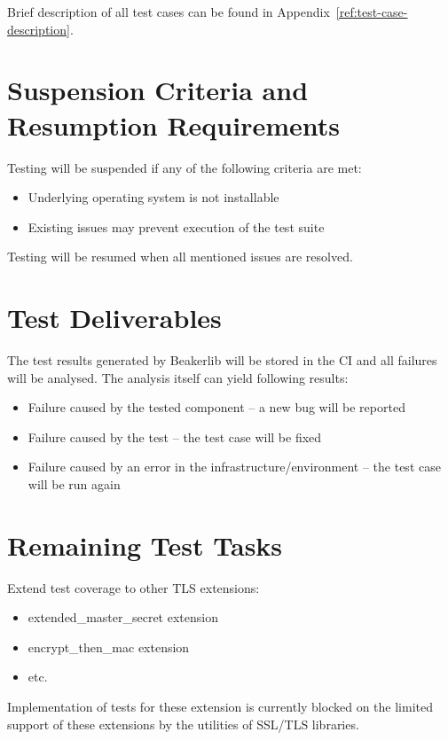     \noindent Brief description of all test cases can be found
    in Appendix~\ref{ref:test-case-description}.

\section{Suspension Criteria and Resumption Requirements}
    Testing will be suspended if any of the following criteria are met:
    \begin{itemize}
        \item Underlying operating system is not installable
        \item Existing issues may prevent execution of the test suite
    \end{itemize}

    Testing will be resumed when all mentioned issues are resolved.

\section{Test Deliverables}
    The test results generated by Beakerlib will be stored in the CI and
    all failures will be analysed. The analysis itself can yield following
    results:

    \begin{itemize}
        \item Failure caused by the tested component -- a new bug will be reported
        \item Failure caused by the test -- the test case will be fixed
        \item Failure caused by an error in the infrastructure/environment --
              the test case will be run again
    \end{itemize}

\section{Remaining Test Tasks}
    Extend test coverage to other TLS extensions:
    \begin{itemize}
        \item extended\_master\_secret extension
        \item encrypt\_then\_mac extension
        \item etc.
    \end{itemize}

    Implementation of tests for these extension is currently blocked on the
    limited support of these extensions by the utilities of SSL/TLS libraries.

